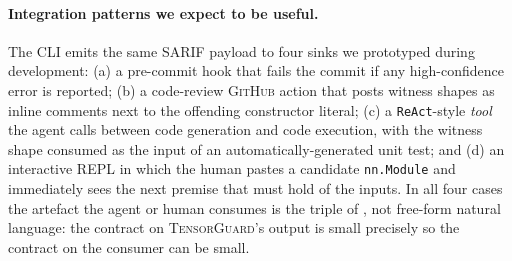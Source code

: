 \documentclass{article}
\theoremstyle{plain}
\theoremstyle{definition}
\newcommand{\TensorGuard}{\textsc{TensorGuard}}
\newcommand{\nnmodule}{\texttt{nn.Module}}
\newcommand{\code}[1]{\texttt{\small #1}}
\begin{document}
\paragraph{Integration patterns we expect to be useful.}
The CLI emits the same SARIF payload to four sinks we prototyped
during development: (a) a pre-commit hook that fails the commit
if any high-confidence error is reported; (b) a code-review
\textsc{GitHub} action that posts witness shapes as inline
comments next to the offending constructor literal; (c) a
\code{ReAct}-style \citep{yao2023react} \emph{tool} the agent calls
between code generation and code execution, with the witness
shape consumed as the input of an automatically-generated unit
test; and (d) an interactive REPL in which the human pastes a
candidate \nnmodule{} and immediately sees the next premise that
must hold of the inputs.  In all four cases the artefact the
agent or human consumes is the triple of
, not free-form natural language: the
contract on \TensorGuard{}'s output is small precisely so the
contract on the consumer can be small.
\end{document}
